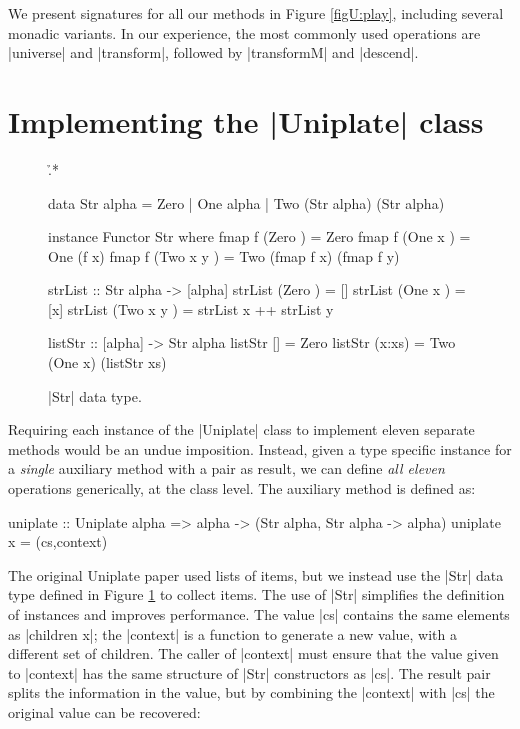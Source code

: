 We present signatures for all our methods in Figure \ref{figU:play}, including several monadic variants. In our experience, the most commonly used operations are |universe| and |transform|, followed by |transformM| and |descend|.


\section{Implementing the |Uniplate| class}
\label{secU:implement_play}

\begin{figure}
\h{.*}\begin{code}
data Str alpha = Zero | One alpha | Two (Str alpha) (Str alpha)

instance Functor Str where
    fmap f (Zero      ) = Zero
    fmap f (One  x    ) = One (f x)
    fmap f (Two  x y  ) = Two (fmap f x) (fmap f y)

strList :: Str alpha -> [alpha]
strList (Zero      ) = []
strList (One  x    ) = [x]
strList (Two  x y  ) = strList x ++ strList y

listStr :: [alpha] -> Str alpha
listStr []      = Zero
listStr (x:xs)  = Two (One x) (listStr xs)
\end{code}
\caption{|Str| data type.}
\label{figU:str}
\end{figure}

Requiring each instance of the |Uniplate| class to implement eleven separate methods would be an undue imposition. Instead, given a type specific instance for a \textit{single} auxiliary method with a pair as result, we can define \textit{all eleven} operations generically, at the class level. The auxiliary method is defined as:

\ignore\begin{code}
uniplate :: Uniplate alpha => alpha -> (Str alpha, Str alpha -> alpha)
uniplate x = (cs,context)
\end{code}

The original Uniplate paper \cite{me:uniplate} used lists of items, but we instead use the |Str| data type defined in Figure \ref{figU:str} to collect items. The use of |Str| simplifies the definition of instances and improves performance. The value |cs| contains the same elements as |children x|; the |context| is a function to generate a new value, with a different set of children. The caller of |context| must ensure that the value given to |context| has the same structure of |Str| constructors as |cs|. The result pair splits the information in the value, but by combining the |context| with |cs| the original value can be recovered:

